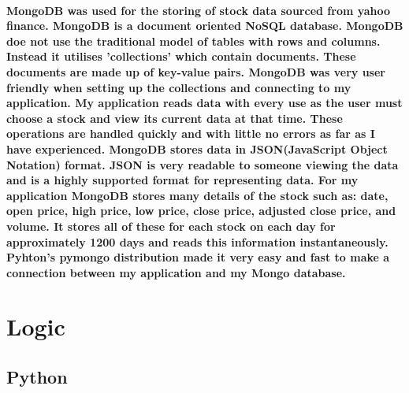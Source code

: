 \paragraph{MongoDB was used for the storing of stock data sourced from yahoo finance. MongoDB is a document oriented NoSQL database. MongoDB doe not use the traditional model of tables with rows and columns. Instead it utilises 'collections' which contain documents. These documents are made up of key-value pairs. MongoDB was very user friendly when setting up the collections and connecting to my application. My application reads data with every use as the user must choose a stock and view its current data at that time. These operations are handled quickly and with little no errors as far as I have experienced. MongoDB stores data in JSON(JavaScript Object Notation) format. JSON is very readable to someone viewing the data and is a highly supported format for representing data. For my application MongoDB stores many details of the stock such as: date, open price, high price, low price, close price, adjusted close price, and volume. It stores all of these for each stock on each day for approximately 1200 days and reads this information instantaneously. Pyhton's pymongo distribution made it very easy and fast to make a connection between my application and my Mongo database.}

\section{Logic}

\subsection{Python}
